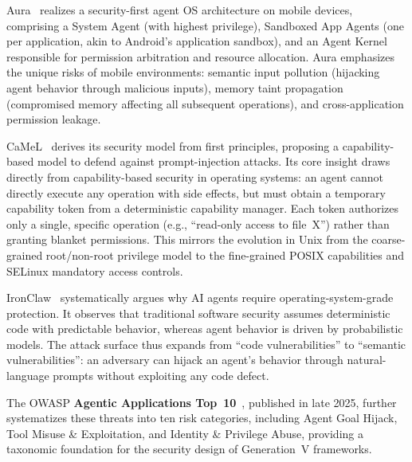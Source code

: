Aura~\cite{aura2025} realizes a security-first agent OS architecture on mobile devices, comprising a System Agent (with highest privilege), Sandboxed App Agents (one per application, akin to Android's application sandbox), and an Agent Kernel responsible for permission arbitration and resource allocation.
Aura emphasizes the unique risks of mobile environments: semantic input pollution (hijacking agent behavior through malicious inputs), memory taint propagation (compromised memory affecting all subsequent operations), and cross-application permission leakage.

CaMeL~\cite{debenedetti2025camel} derives its security model from first principles, proposing a capability-based model to defend against prompt-injection attacks.
Its core insight draws directly from capability-based security in operating systems: an agent cannot directly execute any operation with side effects, but must obtain a temporary capability token from a deterministic capability manager.
Each token authorizes only a single, specific operation (e.g., ``read-only access to file~X'') rather than granting blanket permissions.
This mirrors the evolution in Unix from the coarse-grained root/non-root privilege model to the fine-grained POSIX capabilities and SELinux mandatory access controls.

IronClaw~\cite{ironclaw2025} systematically argues why AI agents require operating-system-grade protection.
It observes that traditional software security assumes deterministic code with predictable behavior, whereas agent behavior is driven by probabilistic models.
The attack surface thus expands from ``code vulnerabilities'' to ``semantic vulnerabilities'': an adversary can hijack an agent's behavior through natural-language prompts without exploiting any code defect.

The OWASP \textbf{Agentic Applications Top~10}~\cite{owasp_agentic2026}, published in late 2025, further systematizes these threats into ten risk categories, including Agent Goal Hijack, Tool Misuse \& Exploitation, and Identity \& Privilege Abuse, providing a taxonomic foundation for the security design of Generation~V frameworks.

